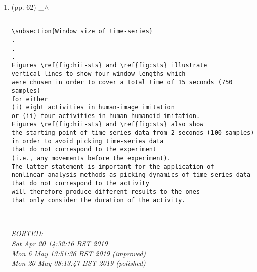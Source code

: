 \documentclass[12pt]{article}
\begin{document}
\begin{enumerate}

\item  (pp. 62)  \_$\wedge$  	


%

	\begin{verbatim}
	
\subsection{Window size of time-series}
.
.
.
Figures \ref{fig:hii-sts} and \ref{fig:sts} illustrate  
vertical lines to show four window lengths which 
were chosen in order to cover a total time of 15 seconds (750 samples)
for either
(i) eight activities in human-image imitation 
or (ii) four activities in human-humanoid imitation.
Figures \ref{fig:hii-sts} and \ref{fig:sts} also show 
the starting point of time-series data from 2 seconds (100 samples) 
in order to avoid picking time-series data 
that do not correspond to the experiment 
(i.e., any movements before the experiment).
The latter statement is important for the application of
nonlinear analysis methods as picking dynamics of time-series data 
that do not correspond to the activity
will therefore produce different results to the ones 
that only consider the duration of the activity. 



	\end{verbatim}
	\textit{
	SORTED: \\
	Sat Apr 20 14:32:16 BST 2019 \\
	Mon  6 May 13:51:36 BST 2019 (improved) \\
	Mon 20 May 08:13:47 BST 2019 (polished)
	}
	\\


\end{enumerate}
\end{document}
